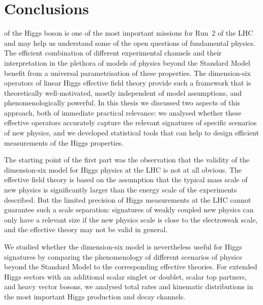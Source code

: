 
 
\chapter{Conclusions}
\label{chapter:conclusions}

 of the Higgs boson is one of
the most important missions for Run~2 of the LHC and may help us
understand some of the open questions of fundamental physics. The
efficient combination of different experimental channels and their
interpretation in the plethora of models of physics beyond the
Standard Model benefit from a universal parametrisation of these
properties. The dimension-six operators of linear Higgs effective
field theory provide such a framework that is theoretically
well-motivated, mostly independent of model assumptions, and
phenomenologically powerful. In this thesis we discussed two aspects
of this approach, both of immediate practical relevance: we analysed
whether these effective operators accurately capture the relevant
signatures of specific scenarios of new physics, and we developed
statistical tools that can help to design efficient measurements of
the Higgs properties.

\newparagraph
%
The starting point of the first part was the observation that the
validity of the dimension-six model for Higgs physics at the LHC is
not at all obvious. The effective field theory is based on the
assumption that the typical mass scale of new physics is significantly
larger than the energy scale of the experiments described. But the
limited precision of Higgs measurements at the LHC cannot guarantee
such a scale separation: signatures of weakly coupled new physics can
only have a relevant size if the new physics scale is close to the
electroweak scale, and the effective theory may not be valid in
general.

We studied whether the dimension-six model is nevertheless useful for
Higgs signatures
by comparing the phenomenology of different scenarios of physics
beyond the Standard Model to the corresponding effective theories. For
extended Higgs sectors with an additional scalar singlet or doublet,
scalar top partners, and heavy vector bosons, we analysed total rates
and kinematic distributions in the most important Higgs production and
decay channels.

